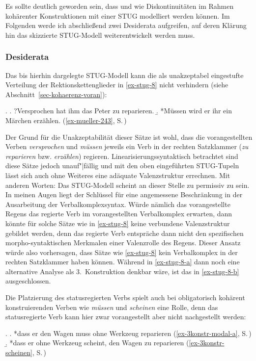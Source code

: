 Es sollte deutlich geworden sein, dass und wie Diskontinuitäten im Rahmen kohärenter Konstruktionen mit einer STUG modelliert werden können. Im Folgenden werde ich abschlie\ss end zwei Desiderata aufgreifen, auf deren Klärung hin das skizzierte STUG-Modell weiterentwickelt werden muss.

\subsubsection*{Desiderata}

Das bis hierhin dargelegte STUG-Modell kann die als unakzeptabel eingestufte Verteilung der Rektionskettenglieder in \ref{ex-stug-8} nicht verhindern (siehe Abschnitt~\ref{sec-kohaerenz-voran}):

\ex. \label{ex-stug-8}
\a. ?Versprochen hat ihm das Peter zu reparieren.\label{ex-stug-8-a}
\b. *Müssen wird er ihr ein Märchen erzählen. \hfill (\ref{ex-mueller-243}, S.\,\pageref{ex-mueller-243})\label{ex-stug-8-b}

Der Grund für die Unakzeptabilität dieser Sätze ist wohl, dass die vorangestellten Verben {\it versprochen} und {\it müssen} jeweils ein Verb in der rechten Satzklammer ({\it zu reparieren} bzw. {\it erzählen}) regieren. Linearisierungssyntaktisch betrachtet sind diese Sätze jedoch unauf"|fällig und mit den oben eingeführten STUG-Tupeln lässt sich auch ohne Weiteres eine adäquate Valenzstruktur errechnen. Mit anderen Worten: Das STUG-Modell scheint an dieser Stelle zu permissiv zu sein. In meinen Augen liegt der Schlüssel für eine angemessene Beschränkung in der Ausarbeitung der Verbalkomplexsyntax. Würde nämlich das vorangestellte Regens das regierte Verb im vorangestellten Verbalkomplex erwarten, dann könnte für solche Sätze wie in \ref{ex-stug-8} keine verbundene Valenzstruktur gebildet werden, denn das regierte Verb entspräche dann nicht den spezifischen morpho-syntaktischen Merkmalen einer Valenzrolle des Regens. Dieser Ansatz würde also vorhersagen, dass Sätze wie \ref{ex-stug-8} kein Verbalkomplex in der rechten Satzklammer haben können. Während in \ref{ex-stug-8-a} dann noch eine alternative Analyse als 3.~Konstruktion denkbar wäre, ist das in \ref{ex-stug-8-b} ausgeschlossen. 

Die Platzierung des statusregierten Verbs spielt auch bei obligatorisch kohärent konstruierenden Verben wie {\it müssen} und {\it scheinen} eine Rolle, denn das statusregierte Verb kann hier zwar vorangestellt aber nicht nachgestellt werden:

\ex.
\a. *dass er den Wagen muss ohne Werkzeug reparieren \hfill (\ref{ex-3konstr-modal-a}, S.\,\pageref{ex-3konstr-modal-a})
\b. *dass er ohne Werkzeug scheint, den Wagen zu reparieren \hfill (\ref{ex-3konstr-scheinen}, S.\,\pageref{ex-3konstr-scheinen})

